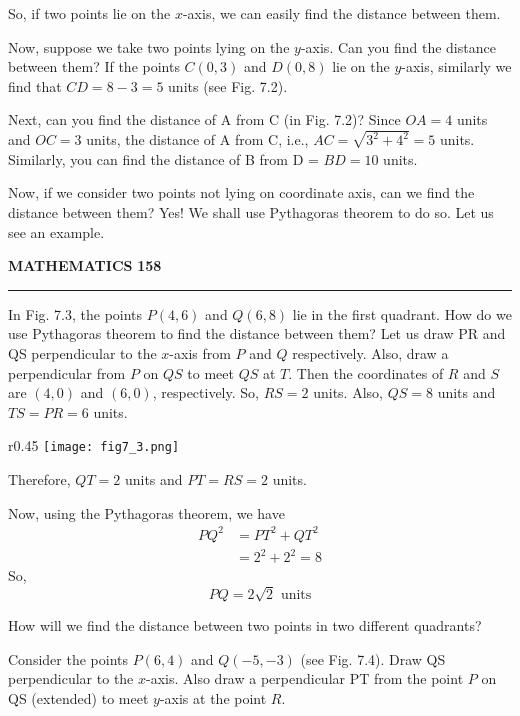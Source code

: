 \documentclass[11pt]{article}
\begin{document}
So, if two points lie on the \(x\)-axis, we can easily find the distance between them.

Now, suppose we take two points lying on the \(y\)-axis. Can you find the distance between them? If the points \(C(0, 3)\) and \(D(0, 8)\) lie on the \(y\)-axis, similarly we find that \(CD = 8 - 3 = 5\) units (see Fig. 7.2).

Next, can you find the distance of A from C (in Fig. 7.2)? Since \(OA = 4\) units and \(OC = 3\) units, the distance of A from C, i.e., \(AC = \sqrt{3^2 + 4^2} = 5\) units. Similarly, you can find the distance of B from D = \(BD = 10\) units.

Now, if we consider two points not lying on coordinate axis, can we find the distance between them? Yes! We shall use Pythagoras theorem to do so. Let us see an example.


{\color{ncertblue}\textbf{MATHEMATICS}} \hfill \textbf{158}
{\color{ncertblue}\noindent\rule{\textwidth}{0.5pt}}

In Fig. 7.3, the points \(P(4, 6)\) and \(Q(6, 8)\) lie in the first quadrant. How do we use Pythagoras theorem to find the distance between them? Let us draw PR and QS perpendicular to the \(x\)-axis from \(P\) and \(Q\) respectively. Also, draw a perpendicular from \(P\) on \(QS\) to meet \(QS\) at \(T\). Then the coordinates of \(R\) and \(S\) are \((4, 0)\) and \((6, 0)\), respectively. So, \(RS = 2\) units. Also, \(QS = 8\) units and \(TS = PR = 6\) units.

\begin{wrapfigure}{r}{0.45\textwidth}
    \centering
    \vspace{-1em}
    \texttt{[image: fig7\_3.png]}
    \vspace{-1em}
\end{wrapfigure}

Therefore, \(QT = 2\) units and \(PT = RS = 2\) units.

Now, using the Pythagoras theorem, we have
\[
\begin{aligned}
PQ^2 &= PT^2 + QT^2 \\
     &= 2^2 + 2^2 = 8
\end{aligned}
\]
So,
\[
PQ = 2\sqrt{2} \text{ units}
\]

How will we find the distance between two points in two different quadrants?

Consider the points \(P(6, 4)\) and \(Q(-5, -3)\) (see Fig. 7.4). Draw QS perpendicular to the \(x\)-axis. Also draw a perpendicular PT from the point \(P\) on QS (extended) to meet \(y\)-axis at the point \(R\).
\end{document}
